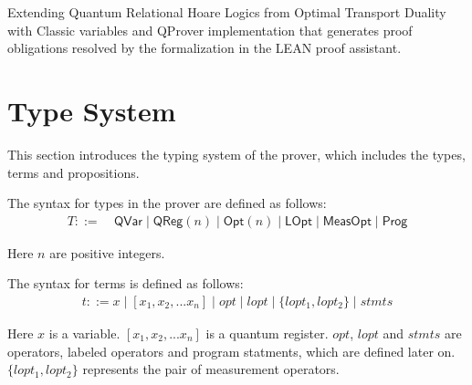 
Extending Quantum Relational Hoare Logics from Optimal Transport Duality with Classic variables and QProver implementation that generates proof obligations resolved by the formalization in the LEAN proof assistant.



\section{Type System}
This section introduces the typing system of the prover, which includes the types, terms and propositions.

\newcommand{\qvar}{\textsf{QVar}}
\newcommand{\qreg}[1]{\ensuremath{\textsf{QReg}(#1)}}
\newcommand{\opt}[1]{\ensuremath{\textsf{Opt}(#1)}}
\newcommand{\lopt}{\ensuremath{\textsf{LOpt}}}
\newcommand{\measopt}{\ensuremath{\textsf{MeasOpt}}}
\newcommand{\unitary}[1]{\ensuremath{\textsf{Unitary}({#1})}}
\newcommand{\assn}[1]{\ensuremath{\textsf{Assn}(#1)}}
\newcommand{\meas}[1]{\ensuremath{\textsf{Meas}(#1)}}
\newcommand{\prog}{\ensuremath{\textsf{Prog}}}
\newcommand{\prop}{\ensuremath{\textsf{Prop}}}
\newcommand{\judge}[4]{\ensuremath{\{#1\}~#2 \sim #3~\{#4\}}}

\begin{definition}
    \label{def:type syntax}
    The syntax for types in the prover are defined as follows:
    \begin{align*}
        T ::=\ & \qvar \mid \qreg{n} \mid \opt{n} \mid \lopt \mid \measopt \mid \prog
    \end{align*}
\end{definition}
Here $n$ are positive integers. 

\newcommand{\assert}[1]{\ensuremath{\textsf{assert}(#1)}}
\newcommand{\pf}{\textsf{proof}}

\begin{definition}
    \label{def:term syntax}
    The syntax for terms is defined as follows:
    \begin{align*}
        t ::= x \mid [x_1, x_2, ... x_n] \mid opt \mid lopt \mid \{lopt_1, lopt_2\} \mid stmts
    \end{align*}
\end{definition}
Here $x$ is a variable. $[x_1, x_2, ... x_n]$ is a quantum register. $opt$, $lopt$ and $stmts$ are operators, labeled operators and program statments, which are defined later on. $\{lopt_1, lopt_2\}$ represents the pair of measurement operators.

